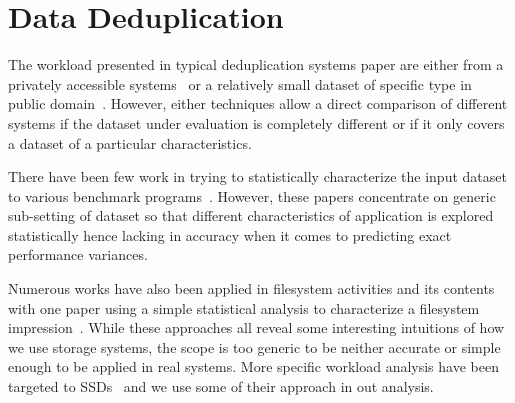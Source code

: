 \section{Data Deduplication}
\label{DD}

The workload presented in typical deduplication systems paper are either from a privately accessible systems~\cite{clements:2009, rhea:2008, manber:1994, aronovich:2009, lillibridge:2009, zhu:2008} or a relatively small dataset of specific type in public domain~\cite{storer:2008, kruus:2010, eshghi:2005}. 
However, either techniques allow a direct comparison of different systems if the dataset under evaluation is completely different or if it only covers a dataset of a particular characteristics.

There have been few work in trying to statistically characterize the input dataset to various benchmark programs~\cite{eeckhout:2003, yi:2002, hsu:2002}. 
However, these papers concentrate on generic sub-setting of dataset so that different characteristics of application is explored statistically hence lacking in accuracy when it comes to predicting exact performance variances.

Numerous works have also been applied in filesystem activities and its contents~\cite{douceur:1999, leung:2008, douceur:1999} with one paper using a simple statistical analysis to characterize a filesystem impression~\cite{agrawal:2009}. 
While these approaches all reveal some interesting intuitions of how we use storage systems, the scope is too generic to be neither accurate or simple enough to be applied in real systems. 
More specific workload analysis have been targeted to SSDs~\cite{soundararajan:2010} and we use some of their approach in out analysis.
